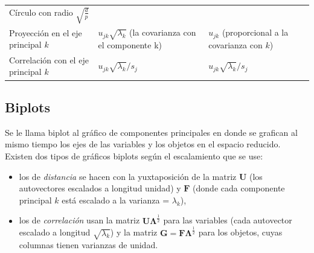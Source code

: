 \documentclass[]{book}
\theoremstyle{definition}
\theoremstyle{definition}
\theoremstyle{definition}
\theoremstyle{remark}
\begin{document}
\begin{longtable}[]{@{}lll@{}}
\begin{minipage}[t]{0.31\columnwidth}
Círculo con radio \(\sqrt{\frac{d}{p}}\)\strut
\end{minipage}\tabularnewline
\begin{minipage}[t]{0.22\columnwidth}\raggedright
Proyección en el eje principal \(k\)\strut
\end{minipage} & \begin{minipage}[t]{0.38\columnwidth}\raggedright
\(u_{jk}\sqrt{\lambda_{k}}\) (la covarianza con el componente k)\strut
\end{minipage} & \begin{minipage}[t]{0.31\columnwidth}\raggedright
\(u_{jk}\) (proporcional a la covarianza con \(k\))\strut
\end{minipage}\tabularnewline
\begin{minipage}[t]{0.22\columnwidth}\raggedright
Correlación con el eje principal \(k\)\strut
\end{minipage} & \begin{minipage}[t]{0.38\columnwidth}\raggedright
\(u_{jk}\sqrt{\lambda_{k}}/s_{j}\)\strut
\end{minipage} & \begin{minipage}[t]{0.31\columnwidth}\raggedright
\(u_{jk}\sqrt{\lambda_{k}}/s_{j}\)\strut
\end{minipage}\tabularnewline
\bottomrule
\end{longtable}

\hypertarget{biplots}{%
\subsection{Biplots}\label{biplots}}

Se le llama biplot al gráfico de componentes principales en donde se
grafican al mismo tiempo los ejes de las variables y los objetos en el
espacio reducido. Existen dos tipos de gráficos biplots según el
escalamiento que se use:

\begin{itemize}
\item
  los de \emph{distancia} se hacen con la yuxtaposición de la matriz
  \(\mathbf{U}\) (los autovectores escalados a longitud unidad) y
  \(\mathbf{F}\) (donde cada componente principal \(k\) está escalado a
  la varianza = \(\lambda_{k}\)),
\item
  los de \emph{correlación} usan la matriz
  \(\mathbf{U}\mathbf{\Lambda}^{\frac{1}{2}}\) para las variables (cada
  autovector escalado a longitud \(\sqrt{\lambda_{k}}\)) y la matriz
  \(\mathbf{G} = \mathbf{F}\mathbf{\Lambda}^{\frac{1}{2}}\) para los
  objetos, cuyas columnas tienen varianzas de unidad.
\end{itemize}
\end{document}
